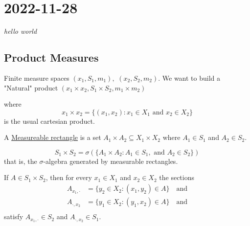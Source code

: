 \section{2022-11-28}

\epigraph{\textit{hello world}}{}


\subsection{Product Measures}

Finite measure spaces $(x_1, S_1, m_1),$ $(x_2, S_2, m_2)$. We want to build a "Natural" product
$(x_1 \times x_2, S_1 \times S_2, m_1 \times m_2 )$ 

where
\[
	x_1 \times x_2 = \{ (x_1, x_2) : x_1 \in X_1 \text{ and } x_2 \in X_2 \}
\] is the usual cartesian product. 


A \underline{Measureable rectangle} is a set $A_1 \times A_2 \subseteq X_1 \times X_2$ where $A_1 \in S_1$ and $A_2 \in S_2$.

\begin{definition}
	\[
		S_1 \times S_2 = \sigma(\{ A_1 \times A_2 : A_1 \in S_1, \text{ and } A_2 \in S_2 \} )
	\] that is, the $\sigma$-algebra generated by measurable rectangles.
\end{definition}

\begin{lemma}
	If $A \in S_1 \times S_2 $, then for every $x_1 \in X_1$ and $x_2 \in X_2$ the sections
	\begin{align*}
		A_{x_1, \cdot } &= \{ y_2 \in X_2 : (x_1 , y_2 ) \in A \} \quad \text{and} \\
		A_{\cdot, x_2 } &= \{ y_1 \in X_2 : (y_1 , x_2 ) \in A \} \quad \text{and} \\
	\end{align*} satisfy $A_{x_1 , \cdot} \in S_2$ and $A_{\cdot, x_2} \in S_1$.
\end{lemma}


